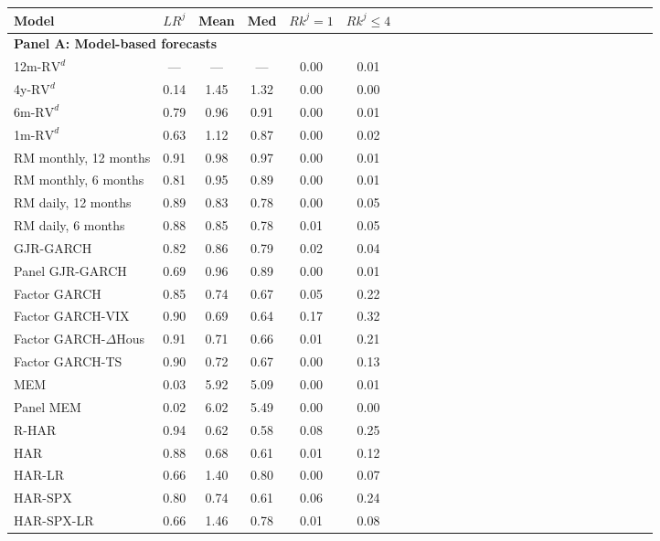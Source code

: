 \begin{tabular}{llccccccccccccccccccccccccc} 
\toprule 
Model & & $LR^j$ & Mean & Med & $Rk^j = 1$ & $Rk^j \leq 4$ \\\midrule 
\multicolumn{4}{l}{\textbf{Panel A: Model-based forecasts}} \\ \midrule 
\multicolumn{2}{l}{12m-$\text{RV}^d$} & --- & --- & --- & 0.00 & 0.01\\ 
\multicolumn{2}{l}{4y-$\text{RV}^d$} & 0.14 & 1.45 & 1.32 & 0.00 & 0.00\\ 
\multicolumn{2}{l}{6m-$\text{RV}^d$} & 0.79 & 0.96 & 0.91 & 0.00 & 0.01\\ 
\multicolumn{2}{l}{1m-$\text{RV}^d$} & 0.63 & 1.12 & 0.87 & 0.00 & 0.02\\ 
\midrule 
\multicolumn{2}{l}{RM monthly, 12 months} & 0.91 & 0.98 & 0.97 & 0.00 & 0.01\\ 
\multicolumn{2}{l}{RM monthly, 6 months} & 0.81 & 0.95 & 0.89 & 0.00 & 0.01\\ 
\multicolumn{2}{l}{RM daily, 12 months} & 0.89 & 0.83 & 0.78 & 0.00 & 0.05\\ 
\multicolumn{2}{l}{RM daily, 6 months} & 0.88 & 0.85 & 0.78 & 0.01 & 0.05\\ 
\midrule 
\multicolumn{2}{l}{GJR-GARCH} & 0.82 & 0.86 & 0.79 & 0.02 & 0.04\\ 
\multicolumn{2}{l}{Panel GJR-GARCH} & 0.69 & 0.96 & 0.89 & 0.00 & 0.01\\ 
\multicolumn{2}{l}{Factor GARCH} & 0.85 & 0.74 & 0.67 & 0.05 & 0.22\\ 
\multicolumn{2}{l}{Factor GARCH-VIX} & 0.90 & 0.69 & 0.64 & 0.17 & 0.32\\ 
\multicolumn{2}{l}{Factor GARCH-$\Delta$Hous} & 0.91 & 0.71 & 0.66 & 0.01 & 0.21\\ 
\multicolumn{2}{l}{Factor GARCH-TS} & 0.90 & 0.72 & 0.67 & 0.00 & 0.13\\ 
\multicolumn{2}{l}{MEM} & 0.03 & 5.92 & 5.09 & 0.00 & 0.01\\ 
\multicolumn{2}{l}{Panel MEM} & 0.02 & 6.02 & 5.49 & 0.00 & 0.00\\ 
\midrule 
\multicolumn{2}{l}{R-HAR} & 0.94 & 0.62 & 0.58 & 0.08 & 0.25\\ 
\multicolumn{2}{l}{HAR} & 0.88 & 0.68 & 0.61 & 0.01 & 0.12\\ 
\multicolumn{2}{l}{HAR-LR} & 0.66 & 1.40 & 0.80 & 0.00 & 0.07\\ 
\multicolumn{2}{l}{HAR-SPX} & 0.80 & 0.74 & 0.61 & 0.06 & 0.24\\ 
\multicolumn{2}{l}{HAR-SPX-LR} & 0.66 & 1.46 & 0.78 & 0.01 & 0.08\\ 

\end{tabular}
